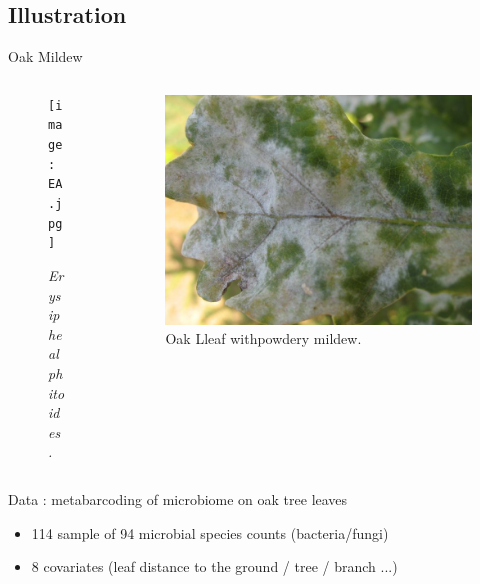 \documentclass{beamer}
\begin{document}
\subsection{Illustration}
\begin{frame}{Oak Mildew}
\begin{columns}
\begin{column}{5cm}
\begin{figure}[htp]
\centering
\texttt{[image: EA.jpg]}
\caption{\textit{Erysiphe alphitoides.}}
\end{figure}
\end{column}
\begin{column}{6cm}
\begin{figure}[htp]
\centering
\includegraphics[scale=0.1]{mildew.jpg}
\caption{Oak Lleaf withpowdery mildew.}
\end{figure}
\end{column}
\end{columns}
\vspace{0.5cm}
Data : metabarcoding of microbiome on oak tree leaves 
\begin{itemize}
	\item 114 sample of 94 microbial species counts (bacteria/fungi)
	\item 8 covariates (leaf distance to the ground / tree / branch ...)
\end{itemize}
\end{frame}
\end{document}
